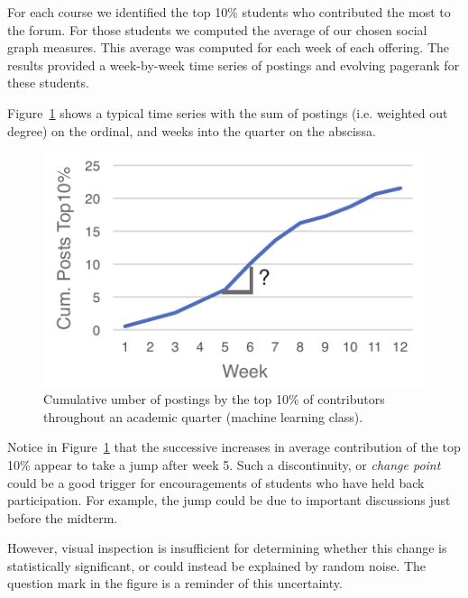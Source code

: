 For each course we identified the top 10\% students who contributed
the most to the forum. For those students we computed the average of
our chosen social graph measures. This average was computed for each
week of each offering. The results provided a week-by-week time series
of postings and evolving pagerank for these students.

Figure~\ref{fig:cs229OutDeg} shows a typical time series with the sum
of postings (i.e. weighted out degree) on the ordinal, and weeks into
the quarter on the abscissa.
\begin{figure}[htp]
       \centering
       \includegraphics{Figs/CS229Fall15DataContributionsNoFrills.pdf}
       \caption{\textnormal{Cumulative umber of postings by the top 10\% of
           contributors throughout an academic quarter (machine
           learning class).}}
       \label{fig:cs229OutDeg}
\end{figure}
Notice in Figure~\ref{fig:cs229OutDeg} that the successive increases
in average contribution of the top 10\% appear to take a jump after
week 5. Such a discontinuity, or {\em change point} could be a good
trigger for encouragements of students who have held back
participation. For example, the jump could be due to important
discussions just before the midterm.

However, visual inspection is insufficient for determining whether
this change is statistically significant, or could instead be
explained by random noise. The question mark in the figure is a
reminder of this uncertainty.

